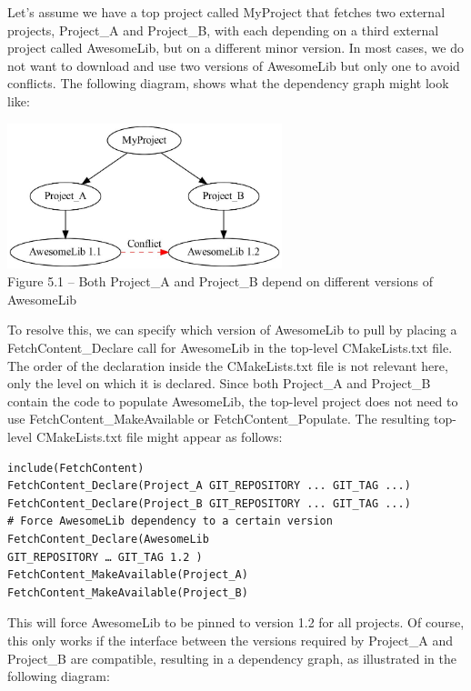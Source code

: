 Let's assume we have a top project called MyProject that fetches two external projects, Project\_A and Project\_B, with each depending on a third external project called AwesomeLib, but on a different minor version. In most cases, we do not want to download and use two versions of AwesomeLib but only one to avoid conflicts. The following diagram, shows what the dependency graph might look like:

\begin{center}
\includegraphics[width=0.6\textwidth]{content/2/chapter5/images/1.jpg}\\
Figure 5.1 – Both Project\_A and Project\_B depend on different versions of AwesomeLib
\end{center}

To resolve this, we can specify which version of AwesomeLib to pull by placing a FetchContent\_Declare call for AwesomeLib in the top-level CMakeLists.txt file. The order of the declaration inside the CMakeLists.txt file is not relevant here, only the level on which it is declared. Since both Project\_A and Project\_B contain the code to populate AwesomeLib, the top-level project does not need to use FetchContent\_MakeAvailable or FetchContent\_Populate. The resulting top-level CMakeLists.txt file might appear as follows:

\begin{lstlisting}[style=styleCMake]
include(FetchContent)
FetchContent_Declare(Project_A GIT_REPOSITORY ... GIT_TAG ...)
FetchContent_Declare(Project_B GIT_REPOSITORY ... GIT_TAG ...)
# Force AwesomeLib dependency to a certain version
FetchContent_Declare(AwesomeLib
GIT_REPOSITORY … GIT_TAG 1.2 )
FetchContent_MakeAvailable(Project_A)
FetchContent_MakeAvailable(Project_B)
\end{lstlisting}

This will force AwesomeLib to be pinned to version 1.2 for all projects. Of course, this only works if the interface between the versions required by Project\_A and Project\_B are compatible, resulting in a dependency graph, as illustrated in the following diagram:

